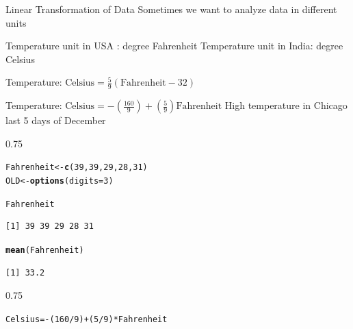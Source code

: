 \documentclass{beamer}\usepackage[]{graphicx}\usepackage[]{color}
\makeatletter
\newcommand{\hlnum}[1]{\textcolor[rgb]{0.2,0.2,0.2}{#1}}%
\newcommand{\hlopt}[1]{\textcolor[rgb]{0.102,0.102,0.102}{#1}}%
\newcommand{\hlstd}[1]{\textcolor[rgb]{0.102,0.102,0.102}{#1}}%
\newcommand{\hlkwb}[1]{\textcolor[rgb]{0.102,0.102,0.102}{#1}}%
\newcommand{\hlkwc}[1]{\textcolor[rgb]{0.2,0.2,0.2}{#1}}%
\newcommand{\hlkwd}[1]{\textcolor[rgb]{0.102,0.102,0.102}{\textbf{#1}}}%
\newenvironment{kframe}{%
 \def\at@end@of@kframe{}%
 \ifinner\ifhmode%
  \def\at@end@of@kframe{\end{minipage}}%
  \begin{minipage}{\columnwidth}%
 \fi\fi%
 \def\FrameCommand##1{\hskip\@totalleftmargin \hskip-\fboxsep
 \colorbox{shadecolor}{##1}\hskip-\fboxsep
     \hskip-\linewidth \hskip-\@totalleftmargin \hskip\columnwidth}%
 \MakeFramed {\advance\hsize-\width
   \@totalleftmargin\z@ \linewidth\hsize
   \@setminipage}}%
 {\par\unskip\endMakeFramed%
 \at@end@of@kframe}
\newenvironment{knitrout}{}{} %
\renewenvironment{knitrout}{\begin{spacing}{0.75}\begin{tiny}}{\end{tiny}\end{spacing}}
\makeatother
\begin{document}
\begin{frame}{Linear Transformation of Data\;\;}
\vspace{0.25cm}
Sometimes we want to analyze data in different units \newline

Temperature unit in USA :  degree Fahrenheit \newline
Temperature unit in India: degree Celsius \newline

Temperature: 
$\displaystyle{ \text{Celsius} = \frac{5}{9} (\text{Fahrenheit} - 32)}$  

Temperature: 
$\displaystyle{ \text{Celsius}  = -\left(\frac{160}{9}\right) + \left(\frac{5}{9}\right)\text{Fahrenheit}}$
\newpage
High temperature in Chicago last 5 days of December
\begin{knitrout}\small
{}\color{fgcolor}\begin{kframe}
\begin{alltt}
\hlstd{Fahrenheit} \hlkwb{<-} \hlkwd{c}\hlstd{(}\hlnum{39}\hlstd{,} \hlnum{39}\hlstd{,} \hlnum{29}\hlstd{,} \hlnum{28}\hlstd{,} \hlnum{31}\hlstd{)}
\hlstd{OLD} \hlkwb{<-} \hlkwd{options}\hlstd{(}\hlkwc{digits}\hlstd{=}\hlnum{3}\hlstd{)}

\hlstd{Fahrenheit}
\end{alltt}
\begin{verbatim}
[1] 39 39 29 28 31
\end{verbatim}
\begin{alltt}
\hlkwd{mean}\hlstd{(Fahrenheit)}
\end{alltt}
\begin{verbatim}
[1] 33.2
\end{verbatim}
\end{kframe}
\end{knitrout}


\begin{knitrout}\small
{}\color{fgcolor}\begin{kframe}
\begin{alltt}
\hlstd{Celsius} \hlkwb{=} \hlopt{-}\hlstd{(}\hlnum{160}\hlopt{/}\hlnum{9}\hlstd{)} \hlopt{+} \hlstd{(}\hlnum{5}\hlopt{/}\hlnum{9}\hlstd{)}\hlopt{*}\hlstd{Fahrenheit}


\end{alltt}
\end{kframe}
\end{knitrout}
\end{frame}
\end{document}
